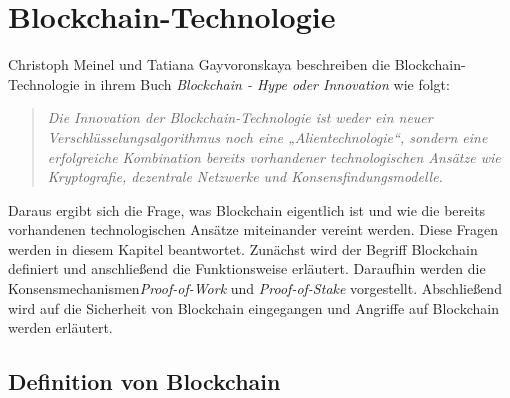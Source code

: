 \section{Blockchain-Technologie}
\label{sec:blockchain_basics}



Christoph Meinel und Tatiana Gayvoronskaya beschreiben die Blockchain-Technologie in ihrem Buch \textit{Blockchain - Hype oder Innovation} wie folgt:

\begin{quote}
    \textit{Die Innovation der Blockchain-Technologie ist weder ein neuer Verschlüsselungsalgorithmus
    noch eine „Alientechnologie“, sondern eine erfolgreiche Kombination bereits
    vorhandener technologischen Ansätze wie Kryptografie, dezentrale Netzwerke und Konsensfindungsmodelle.}\parencite[S. 17]{Meinel_BlockchainHypeInnovation}
\end{quote}

\noindent Daraus ergibt sich die Frage, was Blockchain eigentlich ist und wie die bereits vorhandenen technologischen Ansätze miteinander vereint werden. Diese Fragen werden in diesem Kapitel beantwortet. Zunächst wird der Begriff Blockchain definiert und anschließend die Funktionsweise erläutert. Daraufhin werden die Konsensmechanismen\textit{Proof-of-Work} und \textit{Proof-of-Stake} vorgestellt. Abschließend wird auf die Sicherheit von Blockchain eingegangen und Angriffe auf Blockchain werden erläutert.

\subsection{Definition von Blockchain}
\label{subsec:blockchain_definition}

